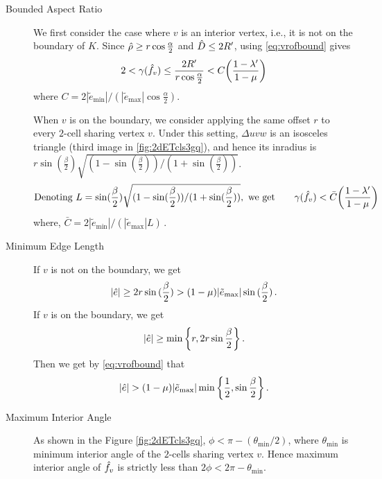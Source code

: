 \begin{description}
\item[Bounded Aspect Ratio]\label{bas:2dETcls3}
  We first consider the case where $v$ is an interior vertex, i.e., it is not on the boundary of $K$.
  Since $\hat{\rho} \geq r \cos{\frac{\alpha}{2}}$ and $\hat{D} \leq 2 R'$,  using \cref{eq:vrofbound} gives
  \begin{equation}
    2 < \gamma(\hat{f}_v) \leq \frac{2R'}{r\cos{\frac{\alpha}{2}}} < C\bigg(\frac{1 - \lambda'}{1 - \mu}\bigg) 
  \end{equation}
  where $C = 2 |\tilde{e}_{\min}| /(|\tilde{e}_{\max}| \cos{\frac{\alpha}{2}})$.
  
  When $v$ is on the boundary, we consider applying the same offset $r$ to every $2$-cell sharing vertex $v$.
  Under this setting, $\Delta uvw$ is an isosceles triangle (third image in \cref{fig:2dETcls3gq}), and hence its inradius is $r \sin(\frac{\beta}{2}) \sqrt{(1- \sin(\frac{\beta}{2}))/(1 + \sin(\frac{\beta}{2}))}$.
  \begin{equation}
    \mbox{Denoting } L = \sin(\frac{\beta}{2}) \sqrt{(1- \sin(\frac{\beta}{2}))/(1 + \sin(\frac{\beta}{2}))},
    \mbox{ we get }~~~~~ \gamma(\hat{f}_v)  < \bar{C}\bigg(\frac{1 - \lambda'}{1 - \mu}\bigg)~
  \end{equation}
  where, $ \bar{C} = 2|\tilde{e}_{\min}| / (|\tilde{e}_{\max}| L)\,$.

\item[Minimum Edge Length]\label{mel:2dETcls3}
If $v$ is not on the boundary, we get
\begin{equation}
    |\hat{e}| \geq 2 r \sin{(\frac{\beta}{2})} > (1 - \mu) |\tilde{e}_{\max}| \sin{(\frac{\beta}{2}}) \,.
\end{equation}
If $v$ is on the boundary, we get
\begin{equation}
    |\hat{e}| \geq \min\bigg\{ r, 2r\sin{\frac{\beta}{2}}\bigg\} \,.
\end{equation}
Then we get by \cref{eq:vrofbound} that
\begin{equation}
    |\hat{e}| > (1 - \mu)|\tilde{e}_{\max}| \min\bigg\{ \frac{1}{2}, \sin{\frac{\beta}{2}}\bigg\}\,.    
\end{equation}

\item[Maximum Interior Angle]\label{mia:2dETcls3}
  As shown in the Figure \ref{fig:2dETcls3gq}, $\phi < \pi - (\theta_{\min}/2)$, where $\theta_{\min}$ is minimum interior angle of the $2$-cells sharing vertex $v$.
  Hence maximum interior angle of $\hat{f}_v$ is strictly less than $2\phi < 2\pi - \theta_{\min}$.  
\end{description}

